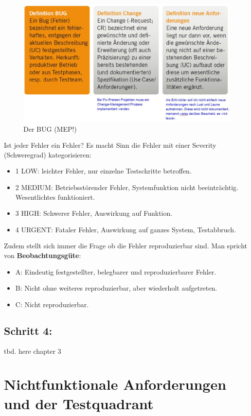 \begin{figure}[h!]
\centering
\includegraphics[width=0.7\linewidth]{fig/der-bug}
\caption{Der BUG (MEP!)}
\label{fig:der-bug}
\end{figure}

Ist jeder Fehler ein Fehler? Es macht Sinn die Fehler mit einer Severity (Schweregrad) kategorisieren:
\begin{itemize}
	\item 1 LOW: leichter Fehler, nur einzelne Testschritte betroffen.
	\item 2 MEDIUM: Betriebsstörender Fehler, Systemfunktion nicht beeinträchtig. Wesentlichtes funktioniert.
	\item 3 HIGH: Schwerer Fehler, Auswirkung auf Funktion.
	\item 4 URGENT: Fataler Fehler, Auswirkung auf ganzes System, Testabbruch.
\end{itemize}

Zudem stellt sich immer die Frage ob die Fehler reproduzierbar sind. Man spricht von \textbf{Beobachtungsgüte}:
\begin{itemize}
	\item A: Eindeutig festgestellter, belegbarer und reproduzierbarer Fehler.
	\item B: Nicht ohne weiteres reproduzierbar, aber wiederholt aufgetreten.
	\item C: Nicht reproduzierbar.	
\end{itemize}

\subsection{Schritt 4: }
tbd. here chapter 3

\newpage
\section{Nichtfunktionale Anforderungen und der Testquadrant}

